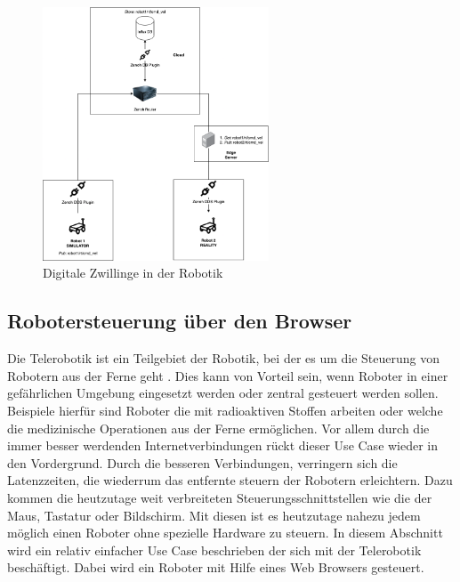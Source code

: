 \begin{figure}
  \begin{center}
    \includegraphics[width=0.6\textwidth]{figures/digitalle-zwillinge.drawio.png}
  \end{center}
  \caption{Digitale Zwillinge in der Robotik}
  \label{fig:Digitale Zwillinge in der Robotik}
\end{figure}


\subsection{Robotersteuerung über den Browser} %
\label{sub:Robotersteuerung über den Browser}

Die Telerobotik ist ein Teilgebiet der Robotik, bei der es um die Steuerung von Robotern aus der Ferne geht \cite{.mMotionControlArtificial2018}. Dies kann von Vorteil sein, wenn Roboter in einer gefährlichen Umgebung eingesetzt werden oder zentral gesteuert werden sollen. Beispiele hierfür sind Roboter die mit radioaktiven Stoffen arbeiten oder welche die medizinische Operationen aus der Ferne ermöglichen. Vor allem durch die immer besser werdenden Internetverbindungen rückt dieser Use Case wieder in den Vordergrund. Durch die besseren Verbindungen, verringern sich die Latenzzeiten, die wiederrum das entfernte steuern der Robotern erleichtern. Dazu kommen die heutzutage weit verbreiteten Steuerungsschnittstellen wie die der Maus, Tastatur oder Bildschirm. Mit diesen ist es heutzutage nahezu jedem möglich einen Roboter ohne spezielle Hardware zu steuern. In diesem Abschnitt wird ein relativ einfacher Use Case beschrieben der sich mit der Telerobotik beschäftigt. Dabei wird ein Roboter mit Hilfe eines Web Browsers gesteuert.\\

